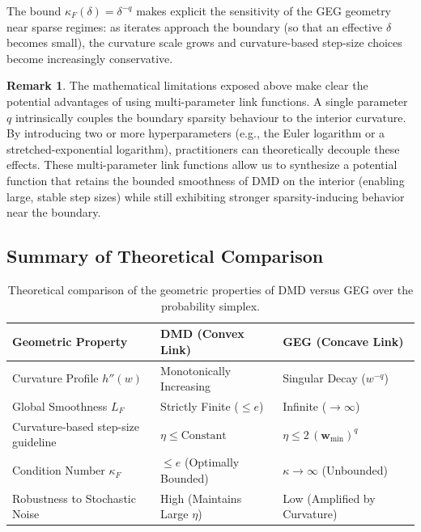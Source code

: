 \documentclass[10pt]{amsart}
\newcommand{\bw}{\boldsymbol{w}}
\theoremstyle{definition}
\newtheorem{remark}{\textbf{Remark}}
\theoremstyle{definition}	 %
\begin{document}
The bound $\kappa_F(\delta)=\delta^{-q}$ makes explicit the sensitivity of the GEG geometry near sparse regimes: as iterates approach the boundary (so that an effective $\delta$ becomes small), the curvature scale grows and curvature-based step-size choices become increasingly conservative.

\begin{remark}%
The mathematical limitations exposed above make clear the potential advantages of using multi-parameter link functions. A single parameter $q$ intrinsically couples the boundary sparsity behaviour to the interior curvature. By introducing two or more hyperparameters (e.g., the Euler logarithm or a stretched-exponential logarithm), practitioners can theoretically decouple these effects. These multi-parameter link functions allow us to synthesize a potential function that retains the bounded smoothness of DMD on the interior (enabling large, stable step sizes) while still exhibiting stronger sparsity-inducing behavior near the boundary.
\end{remark}

\subsection{Summary of Theoretical Comparison}
\label{sec:summary}

\begin{table}[h]
\centering
\caption{Theoretical comparison of the geometric properties of DMD versus GEG over the probability simplex.}
\label{tab:comparison}
\renewcommand{\arraystretch}{1.2}
\begin{tabular}{@{}lll@{}}
\toprule
\textbf{Geometric Property} & \textbf{DMD (Convex Link)} & \textbf{GEG (Concave Link)} \\ \midrule
Curvature Profile $h''(w)$ & Monotonically Increasing & Singular Decay ($w^{-q}$) \\
Global Smoothness $L_F$ & Strictly Finite ($\le e$) & Infinite ($\to \infty$) \\
Curvature-based step-size guideline & $\eta \le \text{Constant}$ & $\eta \le 2 \,(\bw_{\min})^q$ \\
Condition Number $\kappa_F$ & $\le e$ (Optimally Bounded) & $\kappa \to \infty$ (Unbounded) \\
Robustness to Stochastic Noise & High (Maintains Large $\eta$) & Low (Amplified by Curvature) \\
\bottomrule
\end{tabular}
\end{table}
\end{document}
